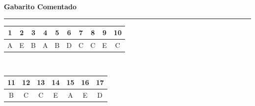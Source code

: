 \documentclass[11pt,a4paper]{article}
\newcommand{\parte}[1]{%
  \needspace{7\baselineskip}
  \vspace{1.8em}
  {\Large\bfseries #1}\\[-0.55em]
  {\color{black!30}\rule{\linewidth}{0.5pt}}
  \par\nobreak\smallskip
}
\begin{document}
\newpage

\parte{Gabarito Comentado}

\begin{center}
{\renewcommand{\arraystretch}{1.25}
\begin{tabular}{cccccccccc}
  \toprule
  1 & 2 & 3 & 4 & 5 & 6 & 7 & 8 & 9 & 10 \\
  \midrule
  A & E & B & A & B & D & C & C & E & C \\
  \bottomrule
\end{tabular}\\[0.7em]
\begin{tabular}{ccccccc}
  \toprule
  11 & 12 & 13 & 14 & 15 & 16 & 17 \\
  \midrule
  B & C & C & E & A & E & D \\
  \bottomrule
\end{tabular}}
\end{center}

\medskip
\end{document}
